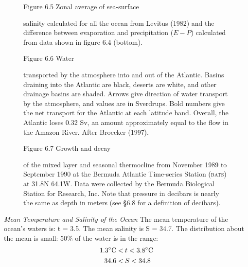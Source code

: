 \begin{figure}[t!]
\footnotesize
Figure 6.5 Zonal average of sea-surface \rule{0mm}{3ex}salinity
calculated for all the ocean from Levitus (1982) and the difference
between evaporation and precipitation ($E - P$) calculated from data
shown in figure 6.4 (bottom).
\label{fig:zonalsalinity}
\vspace{-5ex}
\end{figure}

\begin{figure}[b!]
\vspace{-3ex}
\footnotesize
Figure 6.6 Water \rule{0pt}{3ex} transported
by the atmosphere into and out of the
Atlantic. Basins draining into the Atlantic are black, deserts are
white, and other drainage basins are shaded. Arrows give direction of
water transport by the atmosphere, and values are in Sverdrups. Bold
numbers give the net transport for the Atlantic at each latitude
band. Overall, the Atlantic loses 0.32 Sv, an amount approximately
equal to the flow in the Amazon River. After Broecker (1997).
\label{fig:BroeckerPlot}
\end{figure}

\begin{figure}[t!]
\footnotesize
Figure 6.7 Growth and decay \rule{0mm}{4ex} of the mixed
layer and seasonal
thermocline from November 1989 to
September 1990 at the Bermuda Atlantic Time-series Station
(\textsc{bats}) at 31.8\degrees N 64.1\degrees W. Data were collected
by the Bermuda Biological Station for Research, Inc. Note that
pressure in decibars is nearly the same as depth in meters (see \S 6.8
for a definition of decibars).
\label{fig:seasonalthermo}
\vspace{-4ex}
\end{figure}

\textit{Mean Temperature and Salinity of the Ocean} The mean
temperature of the ocean's waters is: t = 3.5. The mean
salinity is S = 34.7. The distribution about the mean is small: 50\%
of the water is in the range:
\begin{align}
1.3^{\circ}\text{C} < &\:t < 3.8^{\circ}\text{C} \notag \\
34.6 < &\:S < 34.8 \notag
\end{align}

